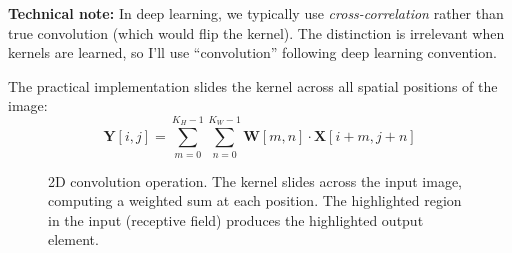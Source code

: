 \textbf{Technical note:} In deep learning, we typically use \textit{cross-correlation} rather than true convolution (which would flip the kernel). The distinction is irrelevant when kernels are learned, so I'll use ``convolution'' following deep learning convention.

The practical implementation slides the kernel across all spatial positions of the image:
\begin{equation}
\mathbf{Y}[i, j] = \sum_{m=0}^{K_H-1} \sum_{n=0}^{K_W-1} \mathbf{W}[m, n] \cdot \mathbf{X}[i + m, j + n]
\label{eq:conv2d_practical}
\end{equation}

\begin{figure}[htbp]
\centering
{}
\caption{2D convolution operation. The kernel slides across the input image, computing a weighted sum at each position. The highlighted region in the input (receptive field) produces the highlighted output element.}
\label{fig:conv2d_operation}
\end{figure}

